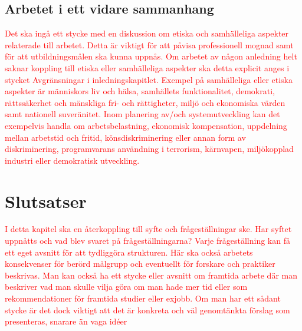 \documentclass[a4paper,12pt,oneside,final]{extbook}
\begin{document}
\section{Arbetet i ett vidare sammanhang}

\textcolor{red}{Det ska ingå ett stycke med en diskussion om etiska och samhälleliga aspekter relaterade till arbetet.
Detta är viktigt för att påvisa professionell mognad samt för att utbildningsmålen ska kunna uppnås.
Om arbetet av någon anledning helt saknar koppling till etiska eller samhälleliga aspekter ska detta
explicit anges i stycket Avgränsningar i inledningskapitlet.
Exempel på samhälleliga eller etiska aspekter är människors liv och hälsa, samhällets funktionalitet,
demokrati, rättssäkerhet och mänskliga fri- och rättigheter, miljö och ekonomiska värden samt
nationell suveränitet. Inom planering av/och systemutveckling kan det exempelvis handla om arbetsbelastning,
ekonomisk kompensation, uppdelning mellan arbetstid och fritid, könsdiskriminering eller
annan form av diskriminering, programvarans användning i terrorism, kärnvapen, miljökopplad industri
eller demokratisk utveckling.}

\chapter{Slutsatser}

\textcolor{red}{I detta kapitel ska en återkoppling till syfte och frågeställningar ske. Har syftet uppnåtts och vad blev
svaret på frågeställningarna? Varje frågeställning kan få ett eget avsnitt för att tydliggöra strukturen.
Här ska också arbetets konsekvenser för berörd målgrupp och eventuellt för forskare och praktiker
beskrivas. Man kan också ha ett stycke eller avsnitt om framtida arbete där man beskriver vad man
skulle vilja göra om man hade mer tid eller som rekommendationer för framtida studier eller exjobb.
Om man har ett sådant stycke är det dock viktigt att det är konkreta och väl genomtänkta förslag som
presenteras, snarare än vaga idéer}






\pagestyle{empty}

\appendix
\end{document}
